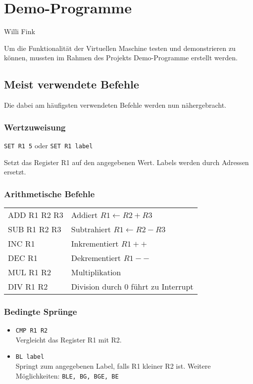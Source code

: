 \section{Demo-Programme}
\begin{flushright}
Willi Fink
\end{flushright}

Um die Funktionalität der Virtuellen Maschine testen und demonstrieren zu
können, mussten im Rahmen des Projekts Demo-Programme erstellt werden. 
\subsection{Meist verwendete Befehle}
Die dabei am häufigsten verwendeten Befehle werden nun nähergebracht.
\subsubsection{Wertzuweisung}
 \texttt{SET R1 5} oder \texttt{SET R1 label}
 
 Setzt das Register R1 auf den angegebenen Wert. Labels werden durch Adressen
ersetzt.
 

\subsubsection{Arithmetische Befehle}
\begin{center}
\begin{tabular}{@{\ttfamily}ll}
ADD R1 R2 R3 & Addiert $R1 \gets R2 + R3$ \\
SUB R1 R2 R3 & Subtrahiert $R1 \gets R2 - R3$\\
INC R1 & Inkrementiert $R1++$\\
DEC R1 & Dekrementiert $R1--$\\
MUL R1 R2 & Multiplikation \\
DIV R1 R2 & Division durch 0 führt zu Interrupt
\end{tabular}
\end{center}
\subsubsection{Bedingte Sprünge}
\begin{itemize}
 \item{\texttt{\texttt{CMP R1 R2}}}\\
 Vergleicht das Register R1 mit R2.
 \item{\texttt{\texttt{BL label}}}\\
 Springt zum angegebenen Label, falls R1 kleiner R2 ist.
 Weitere Möglichkeiten: \texttt{BLE, BG, BGE, BE}
\end{itemize}


